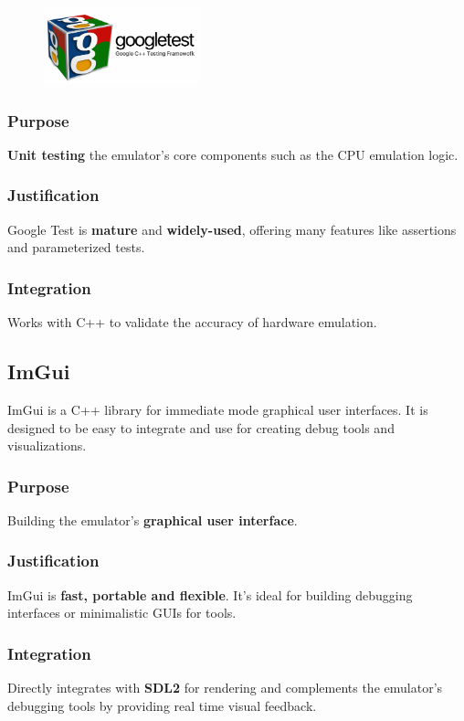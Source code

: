 \documentclass[a4paper, 11pt]{article}
\begin{document}
\begin{figure}[h]
    \centering
    \includegraphics[width=0.4\textwidth]{gtest.png}
\end{figure}

\subsubsection{Purpose}
\textbf{Unit testing} the emulator's core components such as the CPU emulation logic.

\subsubsection{Justification}
Google Test is \textbf{mature} and \textbf{widely-used}, offering many features like assertions and parameterized tests.

\subsubsection{Integration}
Works with C++ to validate the accuracy of hardware emulation.

\subsection{ImGui}
ImGui is a C++ library for immediate mode graphical user interfaces. It is designed to be easy to integrate and use for creating debug tools and visualizations.

\subsubsection{Purpose}
Building the emulator's \textbf{graphical user interface}.

\subsubsection{Justification}
ImGui is \textbf{fast, portable and flexible}. It's ideal for building debugging interfaces or minimalistic GUIs for tools.

\subsubsection{Integration}
Directly integrates with \textbf{SDL2} for rendering and complements the emulator's debugging tools by providing real time visual feedback.
\end{document}
